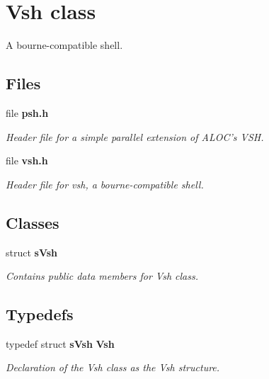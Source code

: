 \section{Vsh class}
\label{a00027}


A bourne-\/compatible shell.  


\subsection*{Files}
\begin{DoxyCompactItemize}
\item 
file {\bf psh.\-h}
\begin{DoxyCompactList}\small\item\em Header file for a simple parallel extension of A\-L\-O\-C's V\-S\-H. \end{DoxyCompactList}\item 
file {\bf vsh.\-h}
\begin{DoxyCompactList}\small\item\em Header file for vsh, a bourne-\/compatible shell. \end{DoxyCompactList}\end{DoxyCompactItemize}
\subsection*{Classes}
\begin{DoxyCompactItemize}
\item 
struct {\bf s\-Vsh}
\begin{DoxyCompactList}\small\item\em Contains public data members for Vsh class. \end{DoxyCompactList}\end{DoxyCompactItemize}
\subsection*{Typedefs}
\begin{DoxyCompactItemize}
\item 
typedef struct {\bf s\-Vsh} {\bf Vsh}
\begin{DoxyCompactList}\small\item\em Declaration of the Vsh class as the Vsh structure. \end{DoxyCompactList}\end{DoxyCompactItemize}
